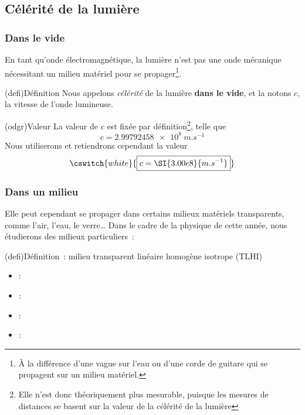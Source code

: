 \documentclass[../../main/main.tex]{subfiles}
\begin{document}
\subsection{Célérité de la lumière}

\subsubsection{Dans le vide}

En tant qu'onde électromagnétique, la lumière n'est pas une onde mécanique
nécessitant un milieu matériel pour se propager\footnote{À la différence d'une
	vague sur l'eau ou d'une corde de guitare qui se propagent sur un milieu
	matériel.}.
\begin{tcb}(defi){Définition}
	Nous appelons \textit{célérité} de la lumière \textbf{dans le vide}, et
	la notons $c$, la vitesse de l'onde lumineuse.
\end{tcb}
\begin{tcb}[sidebyside](odgr){Valeur}
	La valeur de $c$ est fixée par définition\footnote{Elle n'est donc
		théoriquement plus mesurable, puisque les mesures de distances se basent sur
		la valeur de la célérité de la lumière}, telle que
	\[c = \SI{2.99792458e8}{m.s^{-1}}\]
	\tcblower
	Nous utiliserons et retiendrons cependant la valeur
	\[
		\cswitch{white}{
			\boxed{c = \SI{3.00e8}{m.s^{-1}}}
		}
	\]
\end{tcb}

\subsubsection{Dans un milieu}

Elle peut cependant se propager dans certains milieux matériels transparents,
comme l'air, l'eau, le verre… Dans le cadre de la physique de cette année, nous
étudierons des milieux particuliers~:

\begin{tcb}(defi){Définition~: milieu transparent linéaire homogène isotrope (TLHI)}
	\begin{itemize}[leftmargin=66pt]
		\item[\textbf{Transparent}] : 
		\item[\textbf{Linéaire}] : 
		\item[\textbf{Homogène}] : 
		\item[\textbf{Isotrope}] : 
	\end{itemize}
\end{tcb}
\end{document}
